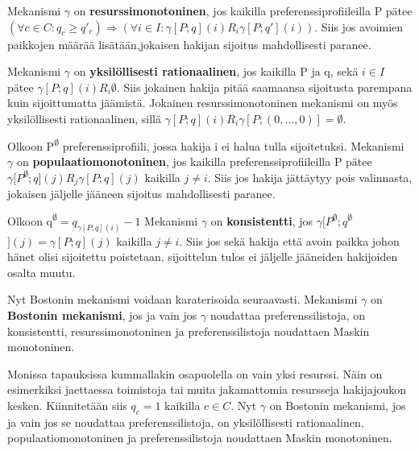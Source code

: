 \documentclass{tktltiki}
\begin{document}
Mekanismi \(\gamma\) on \textbf{resurssimonotoninen}, jos kaikilla
preferenssiprofiileilla P pätee \((\forall c \in C : q_c \geq q'_c)
\Rightarrow (\forall i \in I : \gamma [P;q](i) R_i \gamma
            [P;q'](i))\). Siis jos avoimien paikkojen määrää
            lisätään,jokaisen hakijan sijoitus mahdollisesti paranee.

Mekanismi \(\gamma\) on \textbf{yksilöllisesti rationaalinen}, jos
kaikilla P ja q, sekä \(i \in I\) pätee \(\gamma [P;q](i) R_i
\emptyset\). Siis jokainen hakija pitää saamaansa sijoitusta parempana
kuin sijoittumatta jäämistä. Jokainen resurssimonotoninen mekanismi on
myös yksilöllisesti rationaalinen, sillä \(\gamma [P;q](i) R_i \gamma
[P;(0,\dots,0)] = \emptyset\).

Olkoon P\textsuperscript{\(\emptyset\)} preferenssiprofiili, jossa
hakija i ei halua tulla sijoitetuksi. Mekanismi \(\gamma\) on
\textbf{populaatiomonotoninen}, jos kaikilla preferenssiprofiileilla P
pätee \\ \(\gamma [P\)\textsuperscript{\(\emptyset\)}\(; q](j) R_j \gamma
[P;q](j)\) kaikilla \(j \neq i\). Siis jos hakija jättäytyy pois
valinnasta, jokaisen jäljelle jääneen sijoitus mahdollisesti paranee.

Olkoon q\textsuperscript{\(\emptyset\)}\(= q_{\gamma [P;q](i)} - 1\)
Mekanismi \(\gamma\) on \textbf{konsistentti}, jos \(\gamma
[P\)\textsuperscript{\(\emptyset\)}\(;q\)\textsuperscript{\(\emptyset\)}\(](j)
= \gamma [P;q](j)\) kaikilla \(j \neq i\). Siis jos sekä hakija että
avoin paikka johon hänet olisi sijoitettu poistetaan, sijoittelun
tulos ei jäljelle jääneiden hakijoiden osalta muutu.

Nyt Bostonin mekanismi voidaan karaterisoida seuraavasti. Mekanismi
\(\gamma\) on \textbf{Bostonin mekanismi}, jos ja vain jos \(\gamma\)
noudattaa preferenssilistoja, on konsistentti, resurssimonotoninen ja
preferenssilistoja noudattaen Maskin monotoninen.

Monissa tapauksissa kummallakin osapuolella on vain yksi resurssi.
Näin on esimerkiksi jaettaessa toimistoja tai muita jakamattomia
resursseja hakijajoukon kesken. Kiinnitetään siis \(q_c = 1\) kaikilla
\(c \in C\). Nyt \(\gamma\) on Bostonin mekanismi, jos ja vain jos se
noudattaa preferenssilistoja, on yksilöllisesti rationaalinen,
populaatiomonotoninen ja preferenssilistoja noudattaen Maskin
monotoninen.
\end{document}
